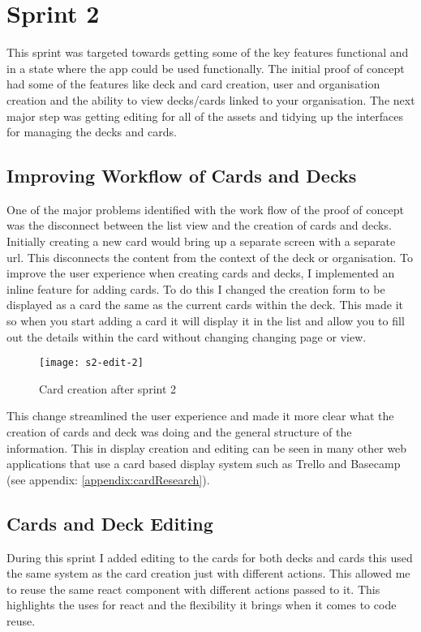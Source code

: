 \section{Sprint 2}
This sprint was targeted towards getting some of the key features functional and in a state where the app could be used functionally. The initial proof of concept had some of the features like deck and card creation, user and organisation creation and the ability to view decks/cards linked to your organisation. The next major step was getting editing for all of the assets and tidying up the interfaces for managing the decks and cards.

\subsection{Improving Workflow of Cards and Decks}
One of the major problems identified with the work flow of the proof of concept was the disconnect between the list view and the creation of cards and decks. Initially creating a new card would bring up a separate screen with a separate url. This disconnects the content from the context of the deck or organisation. To improve the user experience when creating cards and decks, I implemented an inline feature for adding cards. To do this I changed the creation form to be displayed as a card the same as the current cards within the deck. This made it so when you start adding a card it will display it in the list and allow you to fill out the details within the card without changing changing page or view. 

 \begin{figure}
\texttt{[image: s2-edit-2]}
\caption{Card creation after sprint 2}
\centering
\end{figure}


This change streamlined the user experience and made it more clear what the creation of cards and deck was doing and the general structure of the information. This in display creation and editing can be seen in many other web applications that use a card based display system such as Trello and Basecamp (see appendix: \ref{appendix:cardResearch}).

\subsection{Cards and Deck Editing}
During this sprint I added editing to the cards for both decks and cards this used the same system as the card creation just with different actions. This allowed me to reuse the same react component with different actions passed to it. This highlights the uses for react and the flexibility it brings when it comes to code reuse.

